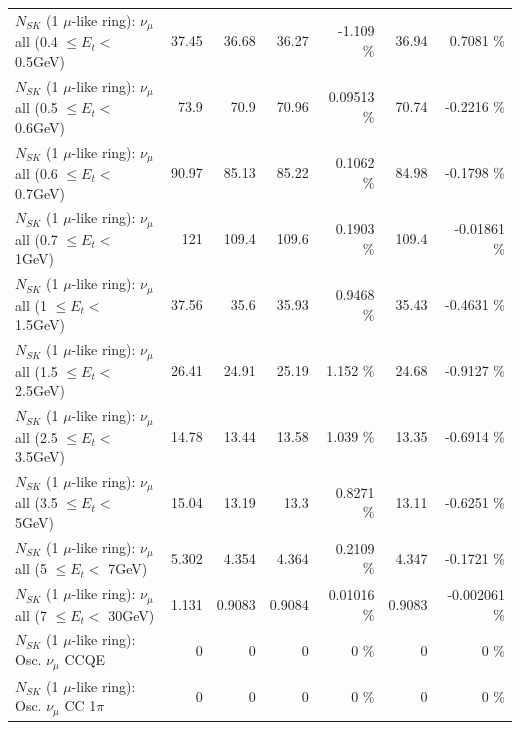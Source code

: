 \begin{table}
\begin{tabular}{| l | r | r | r  r | r  r |}
       $N_{SK}$ (1 $\mu$-like ring): $\nu_{\mu}$ all (0.4 $\leq E_{t} <$ 0.5GeV) &           37.45 &           36.68 &           36.27 &   -1.109 \%  &           36.94 &   0.7081 \%  \\ 
       $N_{SK}$ (1 $\mu$-like ring): $\nu_{\mu}$ all (0.5 $\leq E_{t} <$ 0.6GeV) &            73.9 &            70.9 &           70.96 &  0.09513 \%  &           70.74 &  -0.2216 \%  \\ 
       $N_{SK}$ (1 $\mu$-like ring): $\nu_{\mu}$ all (0.6 $\leq E_{t} <$ 0.7GeV) &           90.97 &           85.13 &           85.22 &   0.1062 \%  &           84.98 &  -0.1798 \%  \\ 
         $N_{SK}$ (1 $\mu$-like ring): $\nu_{\mu}$ all (0.7 $\leq E_{t} <$ 1GeV) &             121 &           109.4 &           109.6 &   0.1903 \%  &           109.4 & -0.01861 \%  \\ 
         $N_{SK}$ (1 $\mu$-like ring): $\nu_{\mu}$ all (1 $\leq E_{t} <$ 1.5GeV) &           37.56 &            35.6 &           35.93 &   0.9468 \%  &           35.43 &  -0.4631 \%  \\ 
       $N_{SK}$ (1 $\mu$-like ring): $\nu_{\mu}$ all (1.5 $\leq E_{t} <$ 2.5GeV) &           26.41 &           24.91 &           25.19 &    1.152 \%  &           24.68 &  -0.9127 \%  \\ 
       $N_{SK}$ (1 $\mu$-like ring): $\nu_{\mu}$ all (2.5 $\leq E_{t} <$ 3.5GeV) &           14.78 &           13.44 &           13.58 &    1.039 \%  &           13.35 &  -0.6914 \%  \\ 
         $N_{SK}$ (1 $\mu$-like ring): $\nu_{\mu}$ all (3.5 $\leq E_{t} <$ 5GeV) &           15.04 &           13.19 &            13.3 &   0.8271 \%  &           13.11 &  -0.6251 \%  \\ 
           $N_{SK}$ (1 $\mu$-like ring): $\nu_{\mu}$ all (5 $\leq E_{t} <$ 7GeV) &           5.302 &           4.354 &           4.364 &   0.2109 \%  &           4.347 &  -0.1721 \%  \\ 
          $N_{SK}$ (1 $\mu$-like ring): $\nu_{\mu}$ all (7 $\leq E_{t} <$ 30GeV) &           1.131 &          0.9083 &          0.9084 &  0.01016 \%  &          0.9083 & -0.002061 \%  \\ 
\hline
\hline
                               $N_{SK}$ (1 $\mu$-like ring): Osc. $\nu_\mu$ CCQE &               0 &               0 &               0 &        0 \%  &               0 &        0 \%  \\ 
                          $N_{SK}$ (1 $\mu$-like ring): Osc. $\nu_\mu$ CC 1$\pi$ &               0 &               0 &               0 &        0 \%  &               0 &        0 \%  \\ 

\end{tabular}
\end{table}
